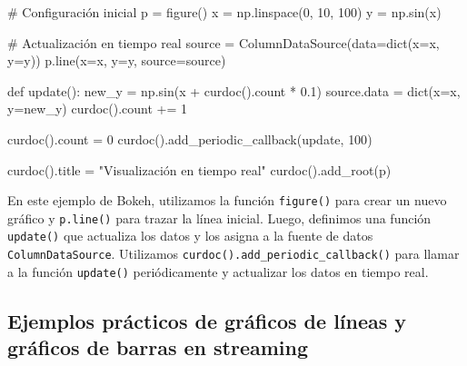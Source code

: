 \documentclass[
  a4paper,
]{article}
\newenvironment{Shaded}{}{}
\newcommand{\BuiltInTok}[1]{\textcolor[rgb]{0.84,0.23,0.29}{#1}}
\newcommand{\CommentTok}[1]{\textcolor[rgb]{0.42,0.45,0.49}{#1}}
\newcommand{\DecValTok}[1]{\textcolor[rgb]{0.00,0.36,0.77}{#1}}
\newcommand{\FloatTok}[1]{\textcolor[rgb]{0.00,0.36,0.77}{#1}}
\newcommand{\KeywordTok}[1]{\textcolor[rgb]{0.84,0.23,0.29}{#1}}
\newcommand{\NormalTok}[1]{\textcolor[rgb]{0.14,0.16,0.18}{#1}}
\newcommand{\OperatorTok}[1]{\textcolor[rgb]{0.14,0.16,0.18}{#1}}
\newcommand{\StringTok}[1]{\textcolor[rgb]{0.01,0.18,0.38}{#1}}
\begin{document}
\begin{Shaded}
\begin{Highlighting}[]
\CommentTok{\# Configuración inicial}
\NormalTok{p }\OperatorTok{=}\NormalTok{ figure()}
\NormalTok{x }\OperatorTok{=}\NormalTok{ np.linspace(}\DecValTok{0}\NormalTok{, }\DecValTok{10}\NormalTok{, }\DecValTok{100}\NormalTok{)}
\NormalTok{y }\OperatorTok{=}\NormalTok{ np.sin(x)}

\CommentTok{\# Actualización en tiempo real}
\NormalTok{source }\OperatorTok{=}\NormalTok{ ColumnDataSource(data}\OperatorTok{=}\BuiltInTok{dict}\NormalTok{(x}\OperatorTok{=}\NormalTok{x, y}\OperatorTok{=}\NormalTok{y))}
\NormalTok{p.line(x}\OperatorTok{=}\StringTok{\textquotesingle{}x\textquotesingle{}}\NormalTok{, y}\OperatorTok{=}\StringTok{\textquotesingle{}y\textquotesingle{}}\NormalTok{, source}\OperatorTok{=}\NormalTok{source)}


\KeywordTok{def}\NormalTok{ update():}
\NormalTok{    new\_y }\OperatorTok{=}\NormalTok{ np.sin(x }\OperatorTok{+}\NormalTok{ curdoc().count }\OperatorTok{*} \FloatTok{0.1}\NormalTok{)}
\NormalTok{    source.data }\OperatorTok{=} \BuiltInTok{dict}\NormalTok{(x}\OperatorTok{=}\NormalTok{x, y}\OperatorTok{=}\NormalTok{new\_y)}
\NormalTok{    curdoc().count }\OperatorTok{+=} \DecValTok{1}


\NormalTok{curdoc().count }\OperatorTok{=} \DecValTok{0}
\NormalTok{curdoc().add\_periodic\_callback(update, }\DecValTok{100}\NormalTok{)}

\NormalTok{curdoc().title }\OperatorTok{=} \StringTok{"Visualización en tiempo real"}
\NormalTok{curdoc().add\_root(p)}
\end{Highlighting}
\end{Shaded}

En este ejemplo de Bokeh, utilizamos la función \texttt{figure()} para
crear un nuevo gráfico y \texttt{p.line()} para trazar la línea inicial.
Luego, definimos una función \texttt{update()} que actualiza los datos y
los asigna a la fuente de datos \texttt{ColumnDataSource}. Utilizamos
\texttt{curdoc().add\_periodic\_callback()} para llamar a la función
\texttt{update()} periódicamente y actualizar los datos en tiempo real.

\hypertarget{ejemplos-pruxe1cticos-de-gruxe1ficos-de-luxedneas-y-gruxe1ficos-de-barras-en-streaming}{%
\subsection{Ejemplos prácticos de gráficos de líneas y gráficos de
barras en
streaming}\label{ejemplos-pruxe1cticos-de-gruxe1ficos-de-luxedneas-y-gruxe1ficos-de-barras-en-streaming}}
\end{document}
